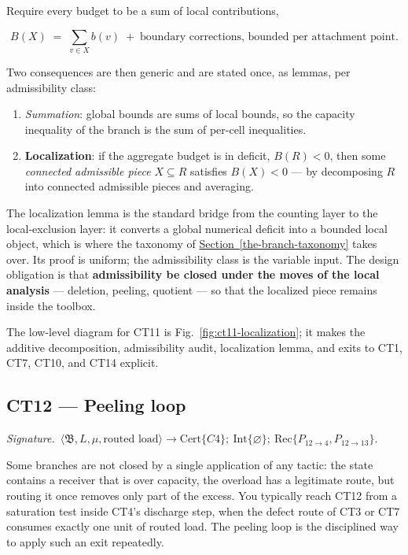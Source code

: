\documentclass[
  11pt,
]{article}
\providecommand{\tightlist}{%
  \setlength{\itemsep}{0pt}\setlength{\parskip}{0pt}}
\theoremstyle{definition}
\newcommand{\secref}[1]{\hyperref[#1]{Section~\ref*{#1}}}
\newcommand{\ctsignature}[1]{\par\noindent\emph{Signature.}\ #1\par\medskip}
\newcommand{\ctcert}[1]{\mathrm{Cert}\{#1\}}
\newcommand{\ctint}[1]{\mathrm{Int}\{#1\}}
\newcommand{\ctrec}[1]{\mathrm{Rec}\{#1\}}
\newcommand{\ctnone}{\varnothing}
\begin{document}
Require every budget to be a sum of local contributions,

\[
B(X)\;=\;\sum_{v\in X} b(v)\;+\;\text{boundary corrections, bounded per attachment point.}
\]

Two consequences are then generic and are stated once, as lemmas, per
admissibility class:

\begin{enumerate}
\def\labelenumi{\arabic{enumi}.}
\tightlist
\item
  \emph{Summation}: global bounds are sums of local bounds, so the
  capacity inequality of the branch is the sum of per-cell inequalities.
\item
  \textbf{Localization}: if the aggregate budget is in deficit,
  \(B(R)<0\), then some \emph{connected admissible piece}
  \(X\subseteq R\) satisfies \(B(X)<0\) --- by decomposing \(R\) into
  connected admissible pieces and averaging.
\end{enumerate}

The localization lemma is the standard bridge from the counting layer to
the local-exclusion layer: it converts a global numerical deficit into a
bounded local object, which is where the taxonomy of \secref{the-branch-taxonomy} takes
over. Its proof is uniform; the admissibility class is the variable
input. The design obligation is that \textbf{admissibility be closed
under the moves of the local analysis} --- deletion, peeling, quotient
--- so that the localized piece remains inside the toolbox.

The low-level diagram for CT11 is Fig.~\ref{fig:ct11-localization};
it makes the additive decomposition, admissibility audit,
localization lemma, and exits to CT1, CT7, CT10, and CT14 explicit.



\subsection{CT12 --- Peeling loop}\label{ct:12}\label{peeling-loops-closure-by-well-founded-recursion}
\ctsignature{\(\langle\mathfrak B,L,\mu,\text{routed load}\rangle
\to \ctcert{C4};\ \ctint{\ctnone};\ \ctrec{P_{12\to4},P_{12\to13}}\).}

Some branches are not closed by a single application of any tactic: the
state contains a receiver that is over capacity, the overload has a
legitimate route, but routing it once removes only part of the excess.
You typically reach CT12 from a saturation test inside CT4's discharge
step, when the defect route of CT3 or CT7 consumes exactly one unit of
routed load.  The peeling loop is the disciplined way to apply such an
exit repeatedly.
\end{document}
